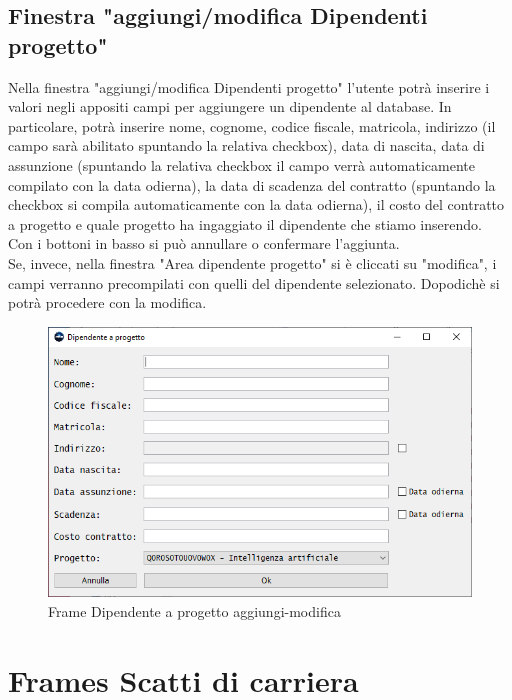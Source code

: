         \subsection {Finestra "aggiungi/modifica Dipendenti progetto"}
            Nella finestra "aggiungi/modifica Dipendenti progetto" l'utente potrà inserire i valori negli appositi campi per aggiungere un dipendente al database. In particolare, potrà inserire nome, cognome, codice fiscale, matricola, indirizzo (il campo sarà abilitato spuntando la relativa checkbox), data di nascita, data di assunzione (spuntando la relativa checkbox il campo verrà automaticamente compilato con la data odierna), la data di scadenza del contratto (spuntando la checkbox si compila automaticamente con la data odierna), il costo del contratto a progetto e quale progetto ha ingaggiato il dipendente che stiamo inserendo.\\
            Con i bottoni in basso si può annullare o confermare l'aggiunta.\\
            Se, invece, nella finestra "Area dipendente progetto" si è cliccati su "modifica", i campi verranno precompilati con quelli del dipendente selezionato. Dopodichè si potrà procedere con la modifica.
            \begin{figure}[htbp!]
                \centering
                    \vspace{2\baselineskip}
                    \includegraphics[width=0.6\linewidth]{Immagini/Frames/Frame aggiungi-modifica/Frame Dipendente a progetto aggiungi-modifica.png}
                \caption{Frame Dipendente a progetto aggiungi-modifica}
                \label{fig:Frame Dipendente a progetto aggiungi-modifica}
            \end{figure}

    \newpage

    \section{Frames Scatti di carriera}
